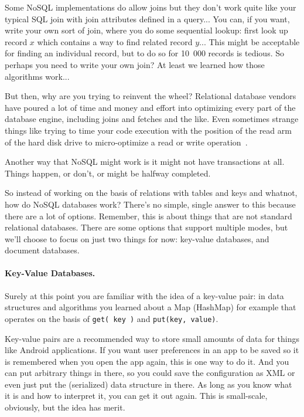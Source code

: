 Some NoSQL implementations do allow joins but they don't work quite like your typical SQL join with join attributes defined in a query... You can, if you want, write your own sort of join, where you do some sequential lookup: first look up record $x$ which contains a way to find related record $y$... This might be acceptable for finding an individual record, but to do so for 10~000 records is tedious. So perhaps you need to write your own join? At least we learned how those algorithms work... 

But then, why are you trying to reinvent the wheel? Relational database vendors have poured a lot of time and money and effort into optimizing every part of the database engine, including joins and fetches and the like. Even sometimes strange things like trying to time your code execution with the position of the read arm of the hard disk drive to micro-optimize a read or write operation~\cite{nosql}. 

Another way that NoSQL might work is it might not have transactions at all. Things happen, or don't, or might be halfway completed. 

So instead of working on the basis of relations with tables and keys and whatnot, how do NoSQL databases work? There's no simple, single answer to this because there are a lot of options. Remember, this is about things that are not standard relational databases. There are some options that support multiple modes, but we'll choose to focus on just two things for now: key-value databases, and document databases.

\paragraph{Key-Value Databases.} Surely at this point you are familiar with the idea of a key-value pair: in data structures and algorithms you learned about a Map (HashMap) for example that operates on the basis of \texttt{get( key )} and \texttt{put(key, value)}. 

Key-value pairs are a recommended way to store small amounts of data for things like Android applications. If you want user preferences in an app to be saved so it is remembered when you open the app again, this is one way to do it. And you can put arbitrary things in there, so you could save the configuration as XML or even just put the (serialized) data structure in there. As long as you know what it is and how to interpret it, you can get it out again. This is small-scale, obviously, but the idea has merit.

